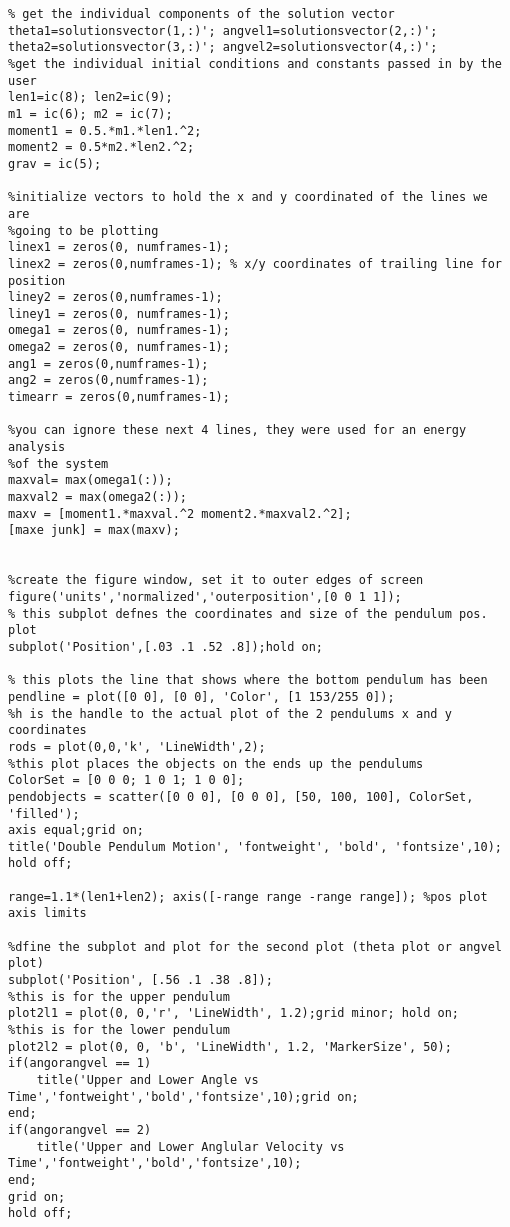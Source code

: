 \documentclass[11]{article}
\begin{document}
\begin{verbatim}
% get the individual components of the solution vector
theta1=solutionsvector(1,:)'; angvel1=solutionsvector(2,:)';
theta2=solutionsvector(3,:)'; angvel2=solutionsvector(4,:)';
%get the individual initial conditions and constants passed in by the user
len1=ic(8); len2=ic(9);
m1 = ic(6); m2 = ic(7);
moment1 = 0.5.*m1.*len1.^2;
moment2 = 0.5*m2.*len2.^2;
grav = ic(5);

%initialize vectors to hold the x and y coordinated of the lines we are
%going to be plotting
linex1 = zeros(0, numframes-1);
linex2 = zeros(0,numframes-1); % x/y coordinates of trailing line for position 
liney2 = zeros(0,numframes-1);
liney1 = zeros(0, numframes-1);
omega1 = zeros(0, numframes-1); 
omega2 = zeros(0, numframes-1);
ang1 = zeros(0,numframes-1);
ang2 = zeros(0,numframes-1);
timearr = zeros(0,numframes-1);

%you can ignore these next 4 lines, they were used for an energy analysis
%of the system
maxval= max(omega1(:));
maxval2 = max(omega2(:));
maxv = [moment1.*maxval.^2 moment2.*maxval2.^2];
[maxe junk] = max(maxv);


%create the figure window, set it to outer edges of screen
figure('units','normalized','outerposition',[0 0 1 1]);
% this subplot defnes the coordinates and size of the pendulum pos. plot
subplot('Position',[.03 .1 .52 .8]);hold on;

% this plots the line that shows where the bottom pendulum has been
pendline = plot([0 0], [0 0], 'Color', [1 153/255 0]);
%h is the handle to the actual plot of the 2 pendulums x and y coordinates
rods = plot(0,0,'k', 'LineWidth',2);
%this plot places the objects on the ends up the pendulums 
ColorSet = [0 0 0; 1 0 1; 1 0 0];
pendobjects = scatter([0 0 0], [0 0 0], [50, 100, 100], ColorSet, 'filled');
axis equal;grid on;
title('Double Pendulum Motion', 'fontweight', 'bold', 'fontsize',10); hold off;

range=1.1*(len1+len2); axis([-range range -range range]); %pos plot axis limits

%dfine the subplot and plot for the second plot (theta plot or angvel plot)
subplot('Position', [.56 .1 .38 .8]);
%this is for the upper pendulum
plot2l1 = plot(0, 0,'r', 'LineWidth', 1.2);grid minor; hold on;
%this is for the lower pendulum
plot2l2 = plot(0, 0, 'b', 'LineWidth', 1.2, 'MarkerSize', 50);
if(angorangvel == 1)
    title('Upper and Lower Angle vs Time','fontweight','bold','fontsize',10);grid on;
end;
if(angorangvel == 2)
    title('Upper and Lower Anglular Velocity vs Time','fontweight','bold','fontsize',10);
end;
grid on;
hold off;


\end{verbatim}
\end{document}
